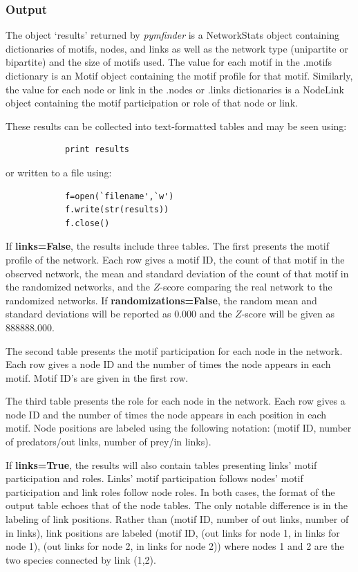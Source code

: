 \documentclass[12pt]{article}
\begin{document}
		\subsubsection{Output}
			The object `results' returned by \emph{pymfinder} is a NetworkStats object containing dictionaries of motifs, nodes, and links as well as the network type (unipartite or bipartite) and the size of motifs used. The value for each motif in the .motifs dictionary is an Motif object containing the motif profile for that motif. Similarly, the value for each node or link in the .nodes or .links dictionaries is a NodeLink object containing the motif participation or role of that node or link.

			These results can be collected into text-formatted tables and may be seen using:
			\begin{lstlisting}
			print results
			\end{lstlisting}
			
			or written to a file using:
			\begin{lstlisting}
			f=open(`filename',`w')
			f.write(str(results))
			f.close()
			\end{lstlisting}

			If \textbf{links=False}, the results include three tables. The first presents the motif profile of the network. Each row gives a motif ID, the count of that motif in the observed network, the mean and standard deviation of the count of that motif in the randomized networks, and the $Z$-score comparing the real network to the randomized networks. If \textbf{randomizations=False}, the random mean and standard deviations will be reported as 0.000 and the $Z$-score will be given as 888888.000.
			
			The second table presents the motif participation for each node in the network. Each row gives a node ID and the number of times the node appears in each motif. Motif ID's are given in the first row.
			
			The third table presents the role for each node in the network. Each row gives a node ID and the number of times the node appears in each position in each motif. Node positions are labeled using the following notation: (motif ID, number of predators/out links, number of prey/in links).

			If \textbf{links=True}, the results will also contain tables presenting links' motif participation and roles. Links' motif participation follows nodes' motif participation and link roles follow node roles. In both cases, the format of the output table echoes that of the node tables. The only notable difference is in the labeling of link positions. Rather than (motif ID, number of out links, number of in links), link positions are labeled (motif ID, (out links for node 1, in links for node 1), (out links for node 2, in links for node 2)) where nodes 1 and 2 are the two species connected by link (1,2).
\end{document}
